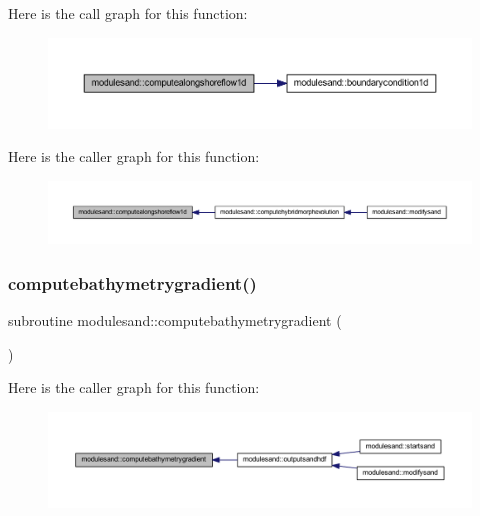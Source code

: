Here is the call graph for this function\+:\nopagebreak
\begin{figure}[H]
\begin{center}
\leavevmode
\includegraphics[width=350pt]{namespacemodulesand_a88ad4d02a6e8f1f1c1585f441fd8a910_cgraph}
\end{center}
\end{figure}
Here is the caller graph for this function\+:\nopagebreak
\begin{figure}[H]
\begin{center}
\leavevmode
\includegraphics[width=350pt]{namespacemodulesand_a88ad4d02a6e8f1f1c1585f441fd8a910_icgraph}
\end{center}
\end{figure}
\mbox{\label{namespacemodulesand_a4fb9cf38c8854f5719cd1bd9633891ce}} 
\subsubsection{\texorpdfstring{computebathymetrygradient()}{computebathymetrygradient()}}
{\footnotesize\ttfamily subroutine modulesand\+::computebathymetrygradient (\begin{DoxyParamCaption}{ }\end{DoxyParamCaption})\hspace{0.3cm}{\ttfamily [private]}}

Here is the caller graph for this function\+:\nopagebreak
\begin{figure}[H]
\begin{center}
\leavevmode
\includegraphics[width=350pt]{namespacemodulesand_a4fb9cf38c8854f5719cd1bd9633891ce_icgraph}
\end{center}
\end{figure}
\mbox{\label{namespacemodulesand_a9176419680bd2427b3dbc5e9807c9ca3}} 
